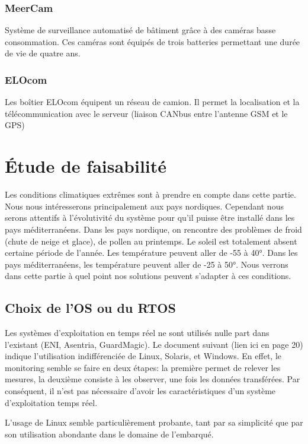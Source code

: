 \subsubsection{MeerCam}

Système de surveillance automatisé de bâtiment grâce à des caméras basse consommation. Ces caméras sont équipés de trois batteries permettant une durée de vie de quatre ans.

\subsubsection{ELOcom}

Les boîtier ELOcom équipent un réseau de camion. Il permet la localisation et la télécommunication avec le serveur (liaison CANbus entre l’antenne GSM et le GPS)

\section{Étude de faisabilité}

Les conditions climatiques extrêmes sont à prendre en compte dans cette partie. Nous nous intéresserons principalement aux pays nordiques. Cependant nous serons attentifs à l’évolutivité du système pour qu’il puisse être installé dans les pays méditerranéens.
Dans les pays nordique, on rencontre des problèmes de froid (chute de neige et glace), de pollen au printemps. Le soleil est totalement absent certaine période de l’année. Les température peuvent aller de -55 à 40°.
Dans les pays méditerranéens, les température peuvent aller de -25 à 50°.
Nous verrons dans cette partie à quel point nos solutions peuvent s’adapter à ces conditions.

\subsection{Choix de l’OS ou du RTOS}

Les systèmes d’exploitation en temps réel ne sont utilisés nulle part dans l’existant (ENI, Asentria, GuardMagic). Le document suivant (lien ici en page 20) indique l’utilisation indifférenciée de Linux, Solaris, et Windows.
En effet, le monitoring semble se faire en deux étapes: la première permet de relever les mesures, la deuxième consiste à les observer, une fois les données transférées. Par conséquent, il n’est pas nécessaire d’avoir les caractéristiques d’un système d’exploitation temps réel.

L’usage de Linux semble particulièrement probante, tant par sa simplicité que par son utilisation abondante dans le domaine de l’embarqué.

